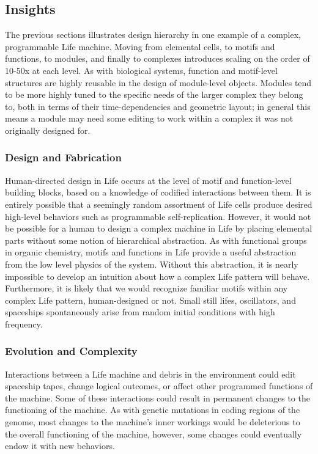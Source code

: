 {\subsection{Insights}

The previous sections illustrates design hierarchy in one example of a complex, programmable Life machine.  Moving from elemental cells, to motifs and functions, to modules, and finally to complexes introduces scaling on the order of 10-50x at each level.  As with biological systems, function and motif-level structures are highly reusable in the design of module-level objects.  Modules tend to be more highly tuned to the specific needs of the larger complex they belong to, both in terms of their time-dependencies and geometric layout; in general this means a module may need some editing to work within a complex it was not originally designed for.

\subsubsection{Design and Fabrication}

Human-directed design in Life occurs at the level of motif and function-level building blocks, based on a knowledge of codified interactions between them.  It is entirely possible that a seemingly random assortment of Life cells produce desired high-level behaviors such as programmable self-replication.  However, it would not be possible for a human to design a complex machine in Life by placing elemental parts without some notion of hierarchical abstraction.  As with functional groups in organic chemistry, motifs and functions in Life provide a useful abstraction from the low level physics of the system.  Without this abstraction, it is nearly impossible to develop an intuition about how a complex Life pattern will behave.  Furthermore, it is likely that we would recognize familiar motifs within any complex Life pattern, human-designed or not.  Small still lifes, oscillators, and spaceships spontaneously arise from random initial conditions with high frequency\cite{Flammenkamp2004}.

\subsubsection{Evolution and Complexity}

Interactions between a Life machine and debris in the environment could edit spaceship tapes, change logical outcomes, or affect other programmed functions of the machine.  Some of these interactions could result in permanent changes to the functioning of the machine.  As with genetic mutations in coding regions of the genome, most changes to the machine's inner workings would be deleterious to the overall functioning of the machine, however, some changes could eventually endow it with new behaviors.

}

